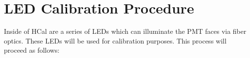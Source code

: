 \documentclass[10pt]{article}
\begin{document}

\section{LED Calibration Procedure}

Inside of HCal are a series of LEDs which can illuminate the PMT faces via fiber optics. These LEDs will be used for calibration purposes. This process will proceed as follows:
\end{document}
